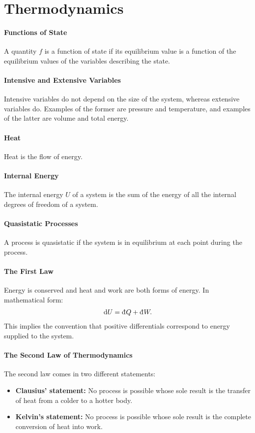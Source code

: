 \section{Thermodynamics}

\paragraph{Functions of State}
A quantity $f$ is a function of state if its equilibrium value is a function of the equilibrium values of the variables describing the state.

\paragraph{Intensive and Extensive Variables}
Intensive variables do not depend on the size of the system, whereas extensive variables do. Examples of the former are pressure and temperature, and examples of the latter are volume and total energy.

\paragraph{Heat}
Heat is the flow of energy.

\paragraph{Internal Energy}
The internal energy $U$ of a system is the sum of the energy of all the internal degrees of freedom of a system.

\paragraph{Quasistatic Processes}
A process is quasistatic if the system is in equilibrium at each point during the process.

\paragraph{The First Law}
Energy is conserved and heat and work are both forms of energy. In mathematical form:
\begin{align*}
	\dd{U} = \din{Q} + \din{W}.
\end{align*}
This implies the convention that positive differentials correspond to energy supplied to the system.

\paragraph{The Second Law of Thermodynamics}
The second law comes in two different statements:
\begin{itemize}
	\item \textbf{Clausius' statement:} No process is possible whose sole result is the transfer of heat from a colder to a hotter body.
	\item \textbf{Kelvin's statement:} No process is possible whose sole result is the complete conversion of heat into work.
\end{itemize}

